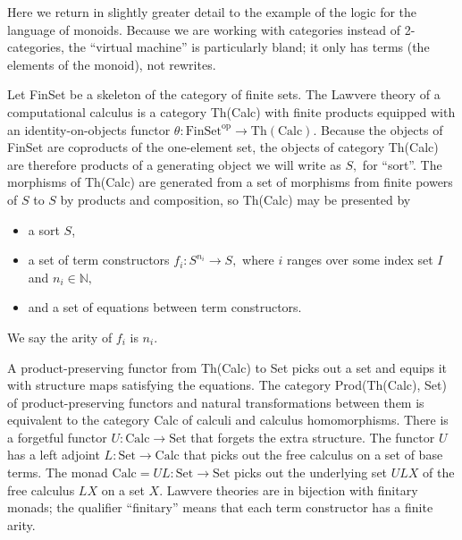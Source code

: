 \documentclass{llncs}
\newcommand{\maps}{\colon}
\newcommand{\FinSet}{\mathrm{FinSet}}
\newcommand{\Set}{\mathrm{Set}}
\newcommand{\Calc}{\mathrm{Calc}}
\newcommand{\op}{\mathrm{op}}
\newcommand{\NN}{\mathbb{N}}
\begin{document}
Here we return in slightly greater detail to the example of the logic for the language of monoids.  Because we are working with categories instead of 2-categories, the ``virtual machine'' is particularly bland; it only has terms (the elements of the monoid), not rewrites.

Let FinSet be a skeleton of the category of finite sets.  The Lawvere theory of a computational calculus is a category Th(Calc) with finite products equipped with an identity-on-objects functor $\theta\maps \FinSet^\op \to \mathrm{Th(Calc)}.$  Because the objects of FinSet are coproducts of the one-element set, the objects of category Th(Calc) are therefore products of a generating object we will write as $S,$ for ``sort''.  The morphisms of Th(Calc) are generated from a set of morphisms from finite powers of $S$ to $S$ by products and composition, so Th(Calc) may be presented by 
\begin{itemize}
  \item a sort $S$,
  \item a set of term constructors $f_i\maps S^{n_i} \to S,$ where $i$ ranges over some index set $I$ and $n_i \in \NN,$
  \item and a set of equations between term constructors.
\end{itemize}
We say the arity of $f_i$ is $n_i.$

A product-preserving functor from Th(Calc) to Set picks out a set and equips it with structure maps satisfying the equations.  The category Prod(Th(Calc), Set) of product-preserving functors and natural transformations between them is equivalent to the category Calc of calculi and calculus homomorphisms.  There is a forgetful functor ${U\maps \Calc \to \Set}$ that forgets the extra structure.  The functor $U$ has a left adjoint ${L\maps \Set \to \Calc}$ that picks out the free calculus on a set of base terms.  The monad $\Calc = UL\maps \Set \to \Set$ picks out the underlying set $ULX$ of the free calculus $LX$ on a set $X$.  Lawvere theories are in bijection with finitary monads; the qualifier ``finitary'' means that each term constructor has a finite arity.
\end{document}
